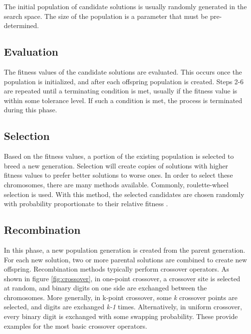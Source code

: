 \documentclass{amsart}
\begin{document}
The initial population of candidate solutions is usually randomly generated in
the search space. The size of the population is a parameter that must be
pre-determined.

\subsection{Evaluation}

The fitness values of the candidate solutions are evaluated. This occurs once
the population is initialized, and after each offspring population is created.
Steps 2-6 are repeated until a terminating condition is met, usually if the
fitness value is within some tolerance level. If such a condition is met, the
process is terminated during this phase.

\subsection{Selection}

Based on the fitness values, a portion of the existing population is selected
to breed a new generation. Selection will create copies of solutions with
higher fitness values to prefer better solutions to worse ones. In order to
select these chromosomes, there are many methods available. Commonly,
roulette-wheel selection is used. With this method, the selected candidates are
chosen randomly with probability proportionate to their relative fitness
\cite{genetic}.

\subsection{Recombination}

In this phase, a new population generation is created from the parent
generation. For each new solution, two or more parental solutions are combined
to create new offspring. Recombination methods typically perform crossover
operators. As shown in figure \ref{fig:crossover}, in one-point crossover, a
crossover site is selected at random, and binary digits on one side are
exchanged between the chromosomes. More generally, in k-point crossover, some
\textit{k} crossover points are selected, and digits are exchanged \textit{k-1}
times. Alternatively, in uniform crossover, every binary digit is exchanged
with some swapping probability. These provide examples for the most basic
crossover operators.
\end{document}
